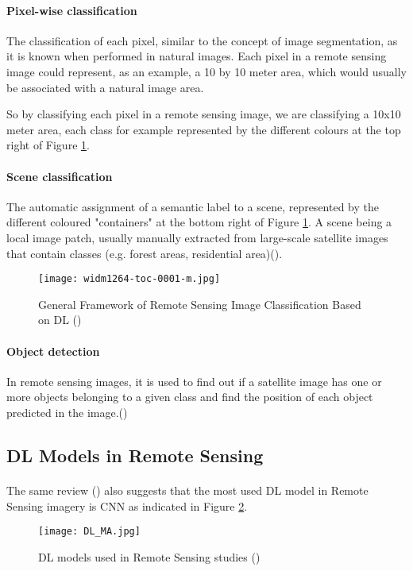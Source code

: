 \paragraph{Pixel-wise classification} The classification of each pixel, similar to the concept of image segmentation, as it is known when performed in natural images. Each pixel in a remote sensing image could represent, as an example, a 10 by 10 meter area, which would usually be associated with a natural image area. 

So by classifying each pixel in a remote sensing image, we are classifying a 10x10 meter area, each class for example represented by the different colours at the top right of Figure \ref{fig_img_class_frame}. 

\paragraph{Scene classification} The automatic assignment of a semantic label to a scene, represented by the different coloured "containers" at the bottom right of Figure \ref{fig_img_class_frame}. A scene being a local image patch, usually manually extracted from large-scale satellite images that contain classes (e.g. forest areas, residential area)(\cite{https://doi.org/10.1002/widm.1264}).

    \begin{figure}[hbt!]
        \centering
        \texttt{[image: widm1264-toc-0001-m.jpg]}
        \caption{General Framework of Remote Sensing Image Classification Based on \gls{DL} (\cite{https://doi.org/10.1002/widm.1264})}
        \label{fig_img_class_frame}
    \end{figure}


\paragraph{Object detection} In remote sensing images, it is used to find out if a satellite image has one or more objects belonging to a given class and find the position of each object predicted in the image.(\cite{CHENG201611})

\subsection{\gls{DL} Models in Remote Sensing} \label{dl_models_rs}
\paragraph{}
The same review (\cite{MA2019166}) also suggests that the most used \gls{DL} model in Remote Sensing imagery is \gls{CNN} as indicated in Figure \ref{fig_dl_rs}.
    \begin{figure}[hbt!]
        \centering
        \texttt{[image: DL\_MA.jpg]}
        \caption{\gls{DL} models used in Remote Sensing studies (\cite{MA2019166})}
        \label{fig_dl_rs}
    \end{figure}
    
